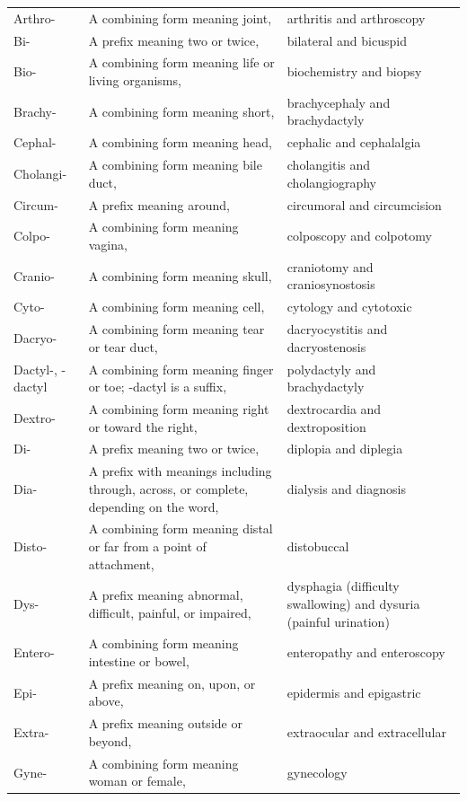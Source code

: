 \begin{longtable}{>{\raggedright\arraybackslash}p{} >{\raggedright\arraybackslash}p{} >{\raggedright\arraybackslash}p{}}
Arthro- & A combining form meaning joint, & arthritis and arthroscopy \\
Bi- & A prefix meaning two or twice, & bilateral and bicuspid \\
Bio- & A combining form meaning life or living organisms, & biochemistry and biopsy \\
Brachy- & A combining form meaning short, & brachycephaly and brachydactyly \\
Cephal- & A combining form meaning head, & cephalic and cephalalgia \\
Cholangi- & A combining form meaning bile duct, & cholangitis and cholangiography \\
Circum- & A prefix meaning around, & circumoral and circumcision \\
Colpo- & A combining form meaning vagina, & colposcopy and colpotomy \\
Cranio- & A combining form meaning skull, & craniotomy and craniosynostosis \\
Cyto- & A combining form meaning cell, & cytology and cytotoxic \\
Dacryo- & A combining form meaning tear or tear duct, & dacryocystitis and dacryostenosis \\
Dactyl-, -dactyl & A combining form meaning finger or toe; -dactyl is a suffix, & polydactyly and brachydactyly \\
Dextro- & A combining form meaning right or toward the right, & dextrocardia and dextroposition \\
Di- & A prefix meaning two or twice, & diplopia and diplegia \\
Dia- & A prefix with meanings including through, across, or complete, depending on the word, & dialysis and diagnosis \\
Disto- & A combining form meaning distal or far from a point of attachment, & distobuccal \\
Dys- & A prefix meaning abnormal, difficult, painful, or impaired, & dysphagia (difficulty swallowing) and dysuria (painful urination) \\
Entero- & A combining form meaning intestine or bowel, & enteropathy and enteroscopy \\
Epi- & A prefix meaning on, upon, or above, & epidermis and epigastric \\
Extra- & A prefix meaning outside or beyond, & extraocular and extracellular \\
Gyne- & A combining form meaning woman or female, & gynecology \\

\end{longtable}
